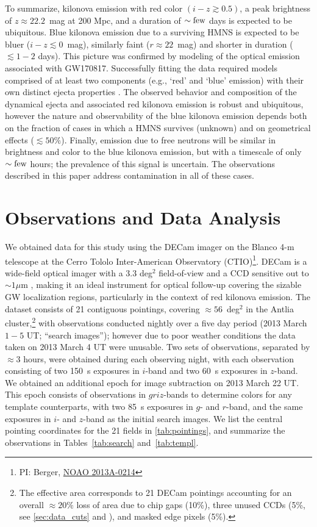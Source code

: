 To summarize, kilonova emission with red color $(i-z\gtrsim 0.5)$, a peak brightness of $z\approx22.2$~mag at 200 Mpc, and a duration of $\sim \rm few$ days is expected to be ubiquitous. Blue kilonova emission due to a surviving HMNS is expected to be bluer ($i-z \lesssim 0$~mag), similarly faint ($r \approx 22$~mag) and shorter in duration ($\lesssim 1-2$ days). This picture was confirmed by modeling of the optical emission associated with GW170817. Successfully fitting the data required models comprised of at least two components (e.g., `red' and `blue' emission) with their own distinct ejecta properties \citep{cowp17, kilpatrick17, tanaka17, villar17}. The observed behavior and composition of the dynamical ejecta and associated red kilonova emission is robust and ubiquitous, however the nature and observability of the blue kilonova emission depends both on the fraction of cases in which a HMNS survives (unknown) and on geometrical effects ($\lesssim 50\%$).  Finally, emission due to free neutrons will be similar in brightness and color to the blue kilonova emission, but with a timescale of only $\sim \rm few$ hours; the prevalence of this signal is uncertain.  The observations described in this paper address contamination in all of these cases.

\section{Observations and Data Analysis} 
\label{sec:obs}

We obtained data for this study using the DECam imager on the Blanco 4-m telescope at the Cerro Tololo Inter-American Observatory (CTIO)\footnote{PI: Berger, \href{https://www.noao.edu/perl/abstract?2013A-0214}{NOAO 2013A-0214}}. DECam is a wide-field optical imager with a 3.3 deg$^2$ field-of-view and a CCD sensitive out to $\sim 1\mu$m \citep{flaugher+15}, making it an ideal instrument for optical follow-up covering the sizable GW localization regions, particularly in the context of red kilonova emission. The dataset consists of 21 contiguous pointings, covering $\approx56$~deg$^2$ in the Antlia cluster,\footnote{The effective area corresponds to 21 DECam pointings accounting for an overall $\approx 20\%$ loss of area due to chip gaps (10\%), three unused CCDs (5\%, see \autoref{sec:data_cuts} and \citealt{diehl+14}), and masked edge pixels (5\%).} with observations conducted nightly over a five day period (2013 March $1-5$ UT; ``search images''); however due to poor weather conditions the data taken on 2013 March 4 UT were unusable. Two sets of observations, separated by $\approx 3$ hours, were obtained during each observing night, with each observation consisting of two 150~s exposures in $i$-band and two 60~s exposures in $z$-band. We obtained an additional epoch for image subtraction on 2013 March 22 UT. This epoch consists of observations in $griz$-bands to determine colors for any template counterparts, with two 85~s exposures in $g$- and $r$-band, and the same exposures in $i$- and $z$-band as the initial search images. We list the central pointing coordinates for the 21 fields in \autoref{tab:pointings}, and summarize the observations in Tables~\ref{tab:search} and~\ref{tab:templ}. 

